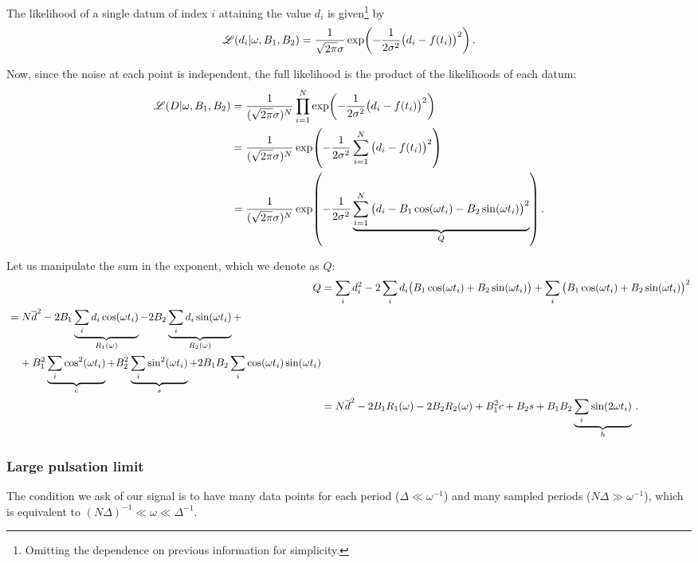 \documentclass[main.tex]{subfiles}
\begin{document}
The likelihood of a single datum of index \(i\) attaining the value \(d_i\) is given\footnote{Omitting the dependence on previous information for simplicity.} by 
%
\begin{align}
\mathscr{L} (d_i | \omega , B_1 , B_2 ) = \frac{1}{\sqrt{2 \pi } \sigma }\exp(- \frac{1}{2 \sigma^2}\qty(d_i - f(t_i))^2)
\,.
\end{align}

Now, since the noise at each point is independent, the full likelihood is the product of the likelihoods of each datum: 
%
\begin{align}
\mathscr{L}(D | \omega , B_1 , B_2 ) &= \frac{1}{(\sqrt{2 \pi } \sigma )^{N}} \prod_{i=1}^{N} \exp(- \frac{1}{2 \sigma^2} \qty(d_i - f(t_i))^2)  \\
&= \frac{1}{(\sqrt{2 \pi } \sigma )^{N}}
\exp(- \frac{1}{2 \sigma^2} \sum_{i=1}^{N} \qty(d_i - f(t_i))^2) \\
&= \frac{1}{(\sqrt{2 \pi } \sigma )^{N}}
\exp(- \frac{1}{2 \sigma^2} \underbrace{\sum_{i=1}^{N} \qty(d_i - B_1  \cos(\omega t_i) - B_2 \sin(\omega t_i))^2}_{Q}) 
\,.
\end{align}

Let us manipulate the sum in the exponent, which we denote as \(Q\): 
%
\begin{align}
Q &= \sum _{i} d_i^2 -2 \sum _i d_i \qty(B_1  \cos(\omega t_i) + B_2 \sin(\omega t_i))
+ \sum _{i} \qty(B_1  \cos(\omega t_i) + B_2 \sin(\omega t_i))^2  \\
\begin{split}
&= N \overline{d}^2 
-2 B_1 \underbrace{\sum _{i} d_i \cos(\omega t_i)}_{R_1(\omega )}
-2 B_2 \underbrace{\sum _{i} d_i \sin(\omega t_i)}_{R_2(\omega )} + \\
&\phantom{=}\ 
+ B_1^2 \underbrace{\sum _{i} \cos^2( \omega t_i)}_{c}
+ B_2^2 \underbrace{\sum _{i} \sin^2( \omega t_i)}_{s}
+ 2 B_1 B_2 \sum _{i} \cos(\omega t_i) \sin(\omega t_i) 
\end{split}  \\
&= N \overline{d}^2 - 2 B_1 R_1(\omega ) -2 B_2 R_2(\omega ) + B_1^2 c + B_2 s + B_1 B_2 \underbrace{\sum _{i} \sin(2 \omega t_i)}_{h}
\,.
\end{align}

\subsubsection{Large pulsation limit}

The condition we ask of our signal is to have many data points for each period (\(\Delta \ll \omega^{-1}\)) and many sampled periods (\(N \Delta  \gg \omega^{-1}\)), which is equivalent to \((N \Delta )^{-1 } \ll \omega \ll \Delta^{-1} \).
\end{document}
